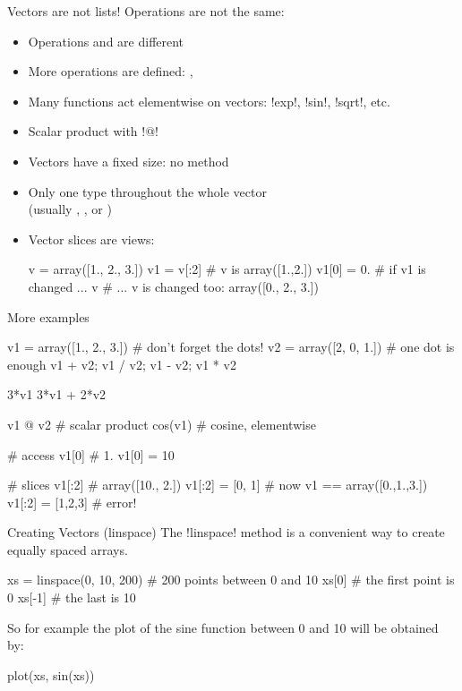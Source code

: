 \documentclass[hyperref={pdfpagelabels=false},table]{beamer}
\begin{document}
\begin{frame}[fragile]{Vectors are not lists!}
Operations are not the same:
\begin{itemize}
\item Operations \pyth{+} and \pyth{*} are \alert{different}
\item More operations are defined: \pyth{-}, \pyth{/}
\item Many functions act elementwise on vectors: \pyth!exp!, \pyth!sin!, \pyth!sqrt!, etc.
\item Scalar product with \pyth!@!
\end{itemize}
\vfill
\begin{itemize}
\item Vectors have a \alert{fixed size}: no  method
\item Only \alert{one type} throughout the whole vector\\ \hfill (usually , ,  or )
\item Vector slices are \alert{views}:
\begin{python}
v = array([1., 2., 3.])
v1 = v[:2] # v is array([1.,2.])
v1[0] = 0. # if v1 is changed ...
v # ... v is changed too: array([0., 2., 3.])
\end{python}
\end{itemize}
\end{frame}
\begin{frame}[fragile]{More examples}
\begin{python}
v1 = array([1., 2., 3.]) # don't forget the dots!
v2 = array([2, 0, 1.]) # one dot is enough
v1 + v2; v1 / v2; v1 - v2; v1 * v2

3*v1
3*v1 + 2*v2
\end{python}
\vfill
\begin{python}
v1 @ v2 # scalar product
cos(v1) # cosine, elementwise

# access
v1[0] # 1.
v1[0] = 10

# slices
v1[:2] # array([10., 2.])
v1[:2] = [0, 1] # now v1 == array([0.,1.,3.])
v1[:2] = [1,2,3] # error!
\end{python}
\end{frame}
\begin{frame}[fragile]{Creating Vectors \hfill (linspace)}
The \pyth!linspace! method is a convenient way to create equally spaced arrays.
\begin{python}
xs = linspace(0, 10, 200) # 200 points between 0 and 10
xs[0] # the first point is 0
xs[-1] # the last is 10
\end{python}
So for example the plot of the sine function between 0 and 10 will be obtained by:
\begin{python}
plot(xs, sin(xs))
\end{python}
\end{frame}
\end{document}
